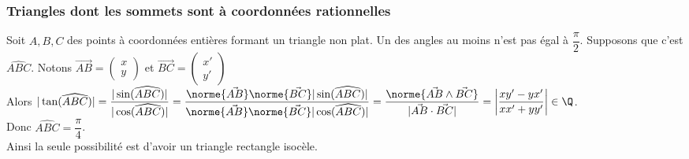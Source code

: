 \documentclass{book}
\begin{document}
	\subsubsection{Triangles dont les sommets sont à coordonnées rationnelles }
	Soit $A,B,C$ des points à coordonnées entières formant un triangle non plat. Un des angles au moins n'est pas égal à $\dfrac{\pi}{2}$. Supposons que c'est $\widehat{ABC}$. Notons $\Vec{AB}=\begin{pmatrix}x\\y\end{pmatrix}$ et $\Vec{BC}=\begin{pmatrix}x'\\y'\end{pmatrix}$\\
	Alors $|\tan(\widehat{ABC})|=\displaystyle\frac{|\sin(\widehat{ABC})|}{|\cos(\widehat{ABC})|}=\frac{\norme{\Vec{AB}}\norme{\Vec{BC}}|\sin(\widehat{ABC})|}{\norme{\Vec{AB}}\norme{\Vec{BC}}|\cos(\widehat{ABC})|}=\frac{\norme{\Vec{AB}\wedge\Vec{BC}}}{|\Vec{AB}\cdot\Vec{BC}|}=\left|\frac{xy'-yx'}{xx'+yy'}\right|\in \Q$.\\
	Donc $\widehat{ABC}=\dfrac{\pi}{4}$.\\
	Ainsi la seule possibilité est d'avoir un triangle rectangle isocèle.
	
\end{document}
